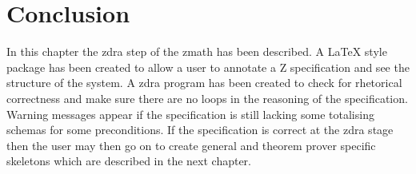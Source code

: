 
\section{Conclusion}
In this chapter the \gls{zdra} step of the \gls{zmath} has been described. A \LaTeX{} style package has been created to allow a user to annotate a Z specification and see the structure of the system. A \gls{zdra} program has been created to check for rhetorical correctness and make sure there are no loops in the reasoning of the specification. Warning messages appear if the specification is still lacking some totalising schemas for some preconditions. If the specification is correct at the \gls{zdra} stage then the user may then go on to create general and theorem prover specific skeletons which are described in the next chapter.